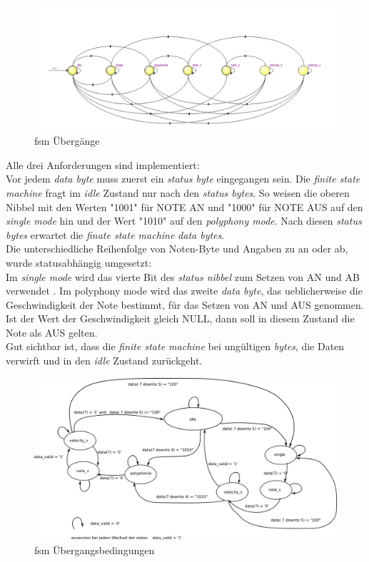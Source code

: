 \begin{figure}[H]
	\centering
	\includegraphics[width=1\textwidth]{images/midi_control/fsm_midicontrol.png}
	\caption{fsm Übergänge}
	\label{fig.midi_fsm_inksape}
\end{figure}
Alle drei Anforderungen sind implementiert:\\
Vor jedem \textit{data byte} muss zuerst ein \textit{status byte} eingegangen sein. Die \textit{finite state machine} fragt im \textit{idle} Zustand nur nach den \textit{status bytes}. So weisen die oberen Nibbel mit den Werten "1001" für NOTE AN und "1000" für NOTE AUS auf den  \textit{single mode} hin und der Wert "1010" auf den \textit{polyphony mode}. Nach diesen \textit{status bytes} erwartet die \textit{finate state machine} \textit{data bytes}.\\ 
Die unterschiedliche Reihenfolge von Noten-Byte und Angaben zu an oder ab, wurde statusabhängig umgesetzt:\\
Im \textit{single mode} wird das vierte Bit des \textit{status nibbel} zum Setzen von AN und AB verwendet . Im polyphony mode wird das zweite \textit{data byte}, das ueblicherweise die Geschwindigkeit der Note bestimmt, für das Setzen von AN und AUS genommen. Ist der Wert der Geschwindigkeit gleich NULL, dann soll in diesem Zustand die Note als AUS gelten.\\
Gut sichtbar ist, dass die \textit{finite state machine} bei ungültigen \textit{bytes}, die Daten verwirft und in den \textit{idle} Zustand zurückgeht.\\

\begin{figure}[H]
	\centering
	\includegraphics[width=1\textwidth]{images/midi_control/fsm_midi_control_inkskape.png}
	\caption{fsm Übergangsbedingungen}
	\label{fig.midi_fsm_quartus}
\end{figure}

